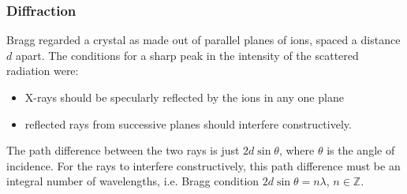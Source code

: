 \documentclass[a4paper]{article}
\begin{document}
\subsubsection*{Diffraction \cite{ashcroft1976solid}}
\begin{Note}
Bragg regarded a crystal as made out of parallel planes of ions, spaced a distance $d$ apart. The conditions for a sharp peak in the intensity of the scattered radiation were:
\begin{itemize}
    \item X-rays should be specularly reflected by the ions in any one plane
    \item reflected rays from successive planes should interfere constructively.
\end{itemize}
The path difference between the two rays is just $2d\sin\theta$, where $\theta$ is the angle of incidence. For the rays to interfere constructively, this path difference must be an integral number of wavelengths, i.e. Bragg condition $2d\sin\theta=n\lambda$, $n\in\mathbb{Z}$.
\end{Note}
\end{document}
